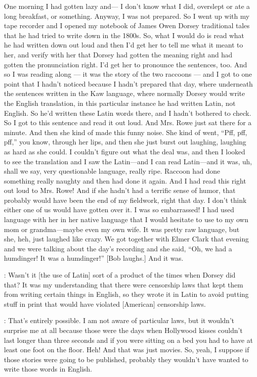 \documentclass[output=paper]{LSP/langsci}
\begin{document}
One morning I had gotten lazy and--- I don't know what I did, overslept or ate a long breakfast, or something. Anyway, I was not prepared. So I went up with my tape recorder and I opened my notebook of James Owen Dorsey traditional tales that he had tried to write down in the 1800s. So, what I would do is read what he had written down out loud and then I'd get her to tell me what it meant to her, and verify with her that Dorsey had gotten the meaning right and had gotten the pronunciation right. I'd get her to pronounce the sentences, too. And so I was reading along --- it was the story of the two raccoons --- and I got to one point that I hadn't noticed because I hadn't prepared that day, where underneath the sentences written in the Kaw language, where normally Dorsey would write the English translation, in this particular instance he had written Latin, not English. So he'd written these Latin words there, and I hadn't bothered to check. So I got to this sentence and read it out loud. And Mrs. Rowe just sat there for a minute. And then she kind of made this funny noise. She kind of went, ``Pff, pff, pff,'' you know, through her lips, and then she just burst out laughing, laughing as hard as she could. I couldn't figure out what the deal was, and then I looked to see the translation and I saw the Latin---and I can read Latin---and it was, uh, shall we say, very questionable language, really ripe. Raccoon had done something really naughty and then had done it again. And I had read this right out loud to Mrs. Rowe! And if she hadn't had a terrific sense of humor, that probably would have been the end of my fieldwork, right that day. I don't think either one of us would have gotten over it. I was so embarrassed! I had used language with her in her native language that I would hesitate to use to my own mom or grandma---maybe even my own wife. It was pretty raw language, but she, heh, just laughed like crazy. We got together with Elmer Clark that evening and we were talking about the day's recording and she said, ``Oh, we had a humdinger! It was a humdinger!'' [Bob laughs.] And it was.

: Wasn't it [the use of Latin] sort of a product of the times when Dorsey did that? It was my understanding that there were censorship laws that kept them from writing certain things in English, so they wrote it in Latin to avoid putting stuff in print that would have violated [American] censorship laws.

: That's entirely possible. I am not aware of particular laws, but it wouldn't surprise me at all because those were the days when Hollywood kisses couldn't last longer than three seconds and if you were sitting on a bed you had to have at least one foot on the floor. Heh! And that was just movies. So, yeah, I suppose if those stories were going to be published, probably they wouldn't have wanted to write those words in English.
\end{document}
